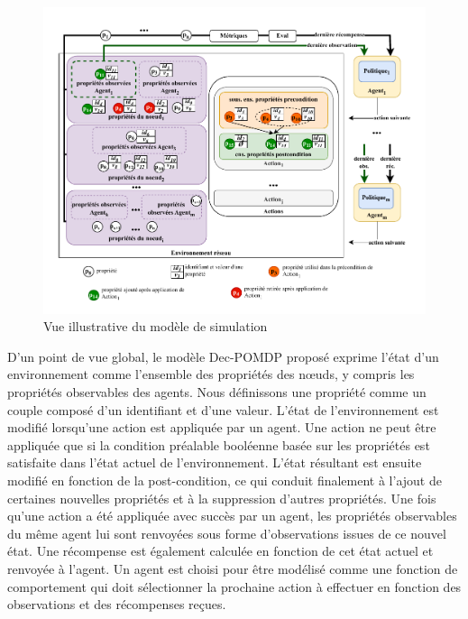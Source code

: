 \

\begin{figure}[]
  \centering
  \includegraphics[trim=0.7cm 0.6cm 0.7cm 1cm, clip,width=1\textwidth]{figures/model_example_illustration.pdf}
  \caption{Vue illustrative du modèle de simulation}
  \label{fig:model_example_illustration}
\end{figure}

\noindent
D'un point de vue global, le modèle Dec-POMDP proposé exprime l'état d'un environnement comme l'ensemble des propriétés des nœuds, y compris les propriétés observables des agents. Nous définissons une propriété comme un couple composé d'un identifiant et d'une valeur. L'état de l'environnement est modifié lorsqu'une action est appliquée par un agent. Une action ne peut être appliquée que si la condition préalable booléenne basée sur les propriétés est satisfaite dans l'état actuel de l'environnement. L'état résultant est ensuite modifié en fonction de la post-condition, ce qui conduit finalement à l'ajout de certaines nouvelles propriétés et à la suppression d'autres propriétés. Une fois qu'une action a été appliquée avec succès par un agent, les propriétés observables du même agent lui sont renvoyées sous forme d'observations issues de ce nouvel état. Une récompense est également calculée en fonction de cet état actuel et renvoyée à l'agent. Un agent est choisi pour être modélisé comme une fonction de comportement qui doit sélectionner la prochaine action à effectuer en fonction des observations et des récompenses reçues.

